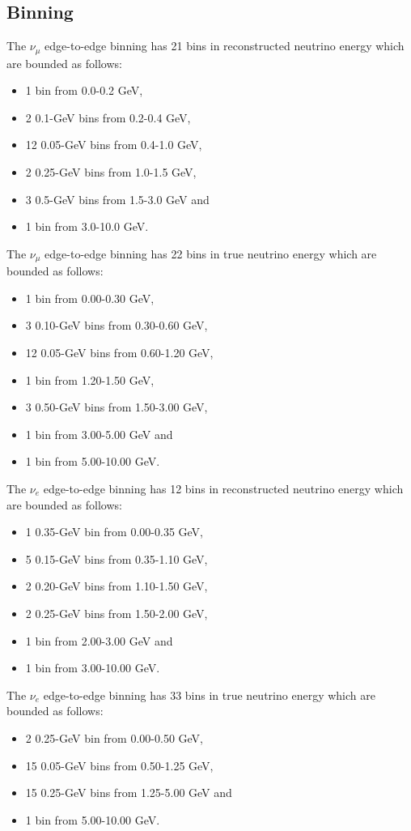 \subsection{Binning}\label{sec:binning}

The $\nu_\mu$ edge-to-edge binning has 21 bins in reconstructed neutrino energy which are bounded as follows:
\begin{itemize}
    \item 1 bin from 0.0-0.2 GeV,
    \item 2 0.1-GeV bins from 0.2-0.4 GeV,
    \item 12 0.05-GeV bins from 0.4-1.0 GeV,
    \item 2 0.25-GeV bins from 1.0-1.5 GeV,
    \item 3 0.5-GeV bins from 1.5-3.0 GeV and
    \item 1 bin from 3.0-10.0 GeV.
\end{itemize}

The $\nu_\mu$ edge-to-edge binning has 22 bins in true neutrino energy which are bounded as follows:
\begin{itemize}
    \item 1 bin from 0.00-0.30 GeV,
    \item 3 0.10-GeV bins from 0.30-0.60 GeV,
    \item 12 0.05-GeV bins from 0.60-1.20 GeV,
    \item 1 bin from 1.20-1.50 GeV,
    \item 3 0.50-GeV bins from 1.50-3.00 GeV,
    \item 1 bin from 3.00-5.00 GeV and
    \item 1 bin from 5.00-10.00 GeV.
\end{itemize}

The $\nu_e$ edge-to-edge binning has 12 bins in reconstructed neutrino energy which are bounded as follows:
\begin{itemize}
    \item 1 0.35-GeV bin from 0.00-0.35 GeV,
    \item 5 0.15-GeV bins from 0.35-1.10 GeV,
    \item 2 0.20-GeV bins from 1.10-1.50 GeV,
    \item 2 0.25-GeV bins from 1.50-2.00 GeV,
    \item 1 bin from 2.00-3.00 GeV and
    \item 1 bin from 3.00-10.00 GeV.
\end{itemize}

The $\nu_e$ edge-to-edge binning has 33 bins in true neutrino energy which are bounded as follows:
\begin{itemize}
    \item 2 0.25-GeV bin from 0.00-0.50 GeV,
    \item 15 0.05-GeV bins from 0.50-1.25 GeV,
    \item 15 0.25-GeV bins from 1.25-5.00 GeV and
    \item 1 bin from 5.00-10.00 GeV.
\end{itemize}


